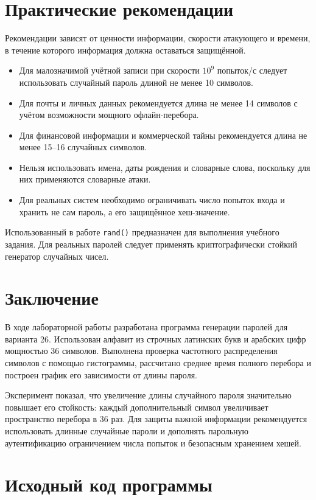 \documentclass[a4paper,14pt,oneside]{extarticle}
\begin{document}
\section{Практические рекомендации}

Рекомендации зависят от ценности информации, скорости атакующего и времени,
в течение которого информация должна оставаться защищённой.

\begin{itemize}
\item Для малозначимой учётной записи при скорости $10^9$ попыток/с следует
использовать случайный пароль длиной не менее 10 символов.
\item Для почты и личных данных рекомендуется длина не менее 14 символов с
учётом возможности мощного офлайн-перебора.
\item Для финансовой информации и коммерческой тайны рекомендуется длина не
менее 15--16 случайных символов.
\item Нельзя использовать имена, даты рождения и словарные слова, поскольку
для них применяются словарные атаки.
\item Для реальных систем необходимо ограничивать число попыток входа и
хранить не сам пароль, а его защищённое хеш-значение.
\end{itemize}

Использованный в работе \texttt{rand()} предназначен для выполнения учебного
задания. Для реальных паролей следует применять криптографически стойкий
генератор случайных чисел.

\section{Заключение}

В ходе лабораторной работы разработана программа генерации паролей для
варианта 26. Использован алфавит из строчных латинских букв и арабских цифр
мощностью 36 символов. Выполнена проверка частотного распределения символов
с помощью гистограммы, рассчитано среднее время полного перебора и построен
график его зависимости от длины пароля.

Эксперимент показал, что увеличение длины случайного пароля значительно
повышает его стойкость: каждый дополнительный символ увеличивает пространство
перебора в 36 раз. Для защиты важной информации рекомендуется использовать
длинные случайные пароли и дополнять парольную аутентификацию ограничением
числа попыток и безопасным хранением хешей.

\appendix
\section{Исходный код программы}


\end{document}
